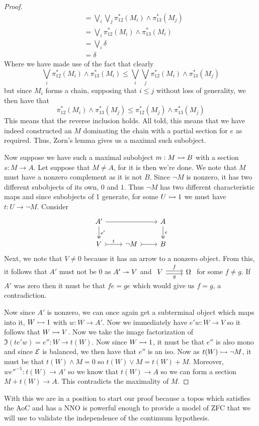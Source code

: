 \begin{proof}
\begin{align*}
      &= \bigvee_i \bigvee_j \pi_{12}^*(M_i) \wedge \pi_{13}^*(M_j)\\
      &= \bigvee_i \pi_{12}^*(M_i) \wedge \pi_{13}^*(M_i)\\
      &= \bigvee_i \delta\\
      &= \delta
  \end{align*}
  Where we have made use of the fact that clearly
  \[
    \bigvee_i \pi_{12}^*(M_i) \wedge \pi_{13}^*(M_i) \le
    \bigvee_i \bigvee_j \pi_{12}^*(M_i) \wedge \pi_{13}^*(M_j)
  \]
  but since $M_i$ forms a chain, supposing that $i \le j$ without loss
  of generality, we then have that
  \[
    \pi_{12}^*(M_i) \wedge \pi_{13}^*(M_j) \le \pi_{12}^*(M_j) \wedge \pi_{13}^*(M_j)
  \]
  This means that the reverse inclusion holds. All told, this means
  that we have indeed constructed an $M$ dominating the chain with a
  partial section for $e$ as required. Thus, Zorn's lemma gives us a
  maximal such subobject.

  Now suppose we have such a maximal subobject $m : M \rightarrowtail B$ with a
  section $s : M \to A$. Let suppose that $M \neq A$, for it is then
  we're done. We note that $M$ must have a nonzero complement as it is
  not $B$. Since $\neg M$ is nonzero, it has two different subobjects
  of its own, $0$ and $1$. Thus $\neg M$ has two different
  characteristic maps and since subobjects of 1 generate, for some
  $U \rightarrowtail 1$ we must have $t : U \to \neg M$. Consider
  \[
    \begin{tikzcd}
      A' \ar[d, "e'", twoheadrightarrow] \ar[rr] & & A \ar[d, twoheadrightarrow, "e"]\\
      V \ar[r, rightarrowtail, "t"] & \neg M \ar[r, rightarrowtail] & B
    \end{tikzcd}
  \]
  Next, we note that $V \neq 0$ because it has an arrow to a nonzero
  object. From this, it follows that $A'$ must not be 0 as $A' \twoheadrightarrow V$
  and
  $\begin{tikzcd}
    V \ar[r, "f", shift left=0.2em] \ar[r, "g", swap, shift right=0.2em] & \Omega
  \end{tikzcd}$
  for some $f \neq g$. If $A'$ was zero then it must be that $fe = ge$
  which would give us $f = g$, a contradiction.

  Now since $A'$ is nonzero, we can once again get a subterminal
  object which maps into it, $W \rightarrowtail 1$ with $w : W \to A'$. Now we
  immediately have $e'w : W \to V$ so it follows that $W \rightarrowtail V$. Now
  we take the image factorization of $\Im(te'w) = e'' : W \to t(W)$.
  Now since $W \rightarrowtail 1$, it must be that $e''$ is also mono and since
  $\mathcal{E}$ is balanced, we then have that $e''$ is an iso. Now as
  $t(W) \rightarrowtail \neg M$, it must be that $t(W) \wedge M = 0$ so
  $t(W) \vee M = t(W) + M$. Moreover, $we''^{-1} : t(W) \to A'$ so we
  know that $t(W) \to A$ so we can form a section $M + t(W) \to A$.
  This contradicts the maximality of $M$.
\end{proof}

With this we are in a position to start our proof because a topos
which satisfies the AoC and has a NNO is powerful enough to provide a
model of ZFC that we will use to validate the independence of the
continuum hypothesis.
